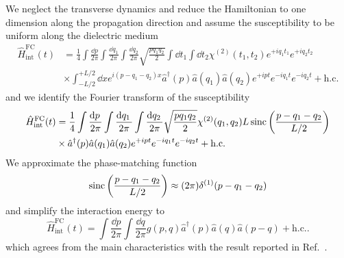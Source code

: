 We neglect the transverse dynamics and reduce the Hamiltonian to one dimension along the propagation direction and assume the susceptibility to be uniform along the dielectric medium
\begin{equation}
	\begin{split}
		\hat{H}_\text{int}^\text{FC}(t)
		&=
		\frac{1}{4}
		\int\frac{\dd{p}}{2\pi}
		\int\frac{\dd{q_1}}{2\pi}
		\int\frac{\dd{q_2}}{2\pi}
		\sqrt{\frac{pq_1q_2}{2}}
		\int\dd{t_1}
		\int\dd{t_2}
		\chi^{(2)}(t_1,t_2)
		e^{+iq_1t_1}
		e^{+iq_2t_2}
		\\
		&\times
		\int_{-L/2}^{+L/2}\dd{x}
		e^{i(p-q_1-q_2)x}
		\hat{a}^\dagger(p)
		\hat{a}(q_1)
		\hat{a}(q_2)
		e^{+ipt}
		e^{-iq_1t}
		e^{-iq_2t}
		+
		\text{h.c.}
	\end{split}
\end{equation}
and we identify the Fourier transform of the susceptibility
\begin{equation}
	\begin{split}
		\hat{H}_\text{int}^\text{FC}(t)
		&=
		\frac{1}{4}
		\int\frac{\dd{p}}{2\pi}
		\int\frac{\dd{q_1}}{2\pi}
		\int\frac{\dd{q_2}}{2\pi}
		\sqrt{\frac{pq_1q_2}{2}}
		\chi^{(2)}(q_1,q_2)L
		\sinc\left(\frac{p-q_1-q_2}{L/2}\right)
		\\
		&\times
		\hat{a}^\dagger(p)
		\hat{a}(q_1)
		\hat{a}(q_2)
		e^{+ipt}
		e^{-iq_1t}
		e^{-iq_2t}
		+
		\text{h.c.}
	\end{split}
\end{equation}
We approximate the phase-matching function
\begin{equation}
	\operatorname{sinc}\left(\frac{p-q_1-q_2}{L/2}\right)
	\approx
	(2\pi)
	\delta^{(1)}(p-q_1-q_2)
\end{equation}
and simplify the interaction energy to
\begin{equation}
	\hat{H}_\text{int}^\text{FC}(t)
	=
	\int\frac{\dd{p}}{2\pi}
	\int\frac{\dd{q}}{2\pi}
	g(p,q)
	\hat{a}^\dagger(p)
	\hat{a}(q)
	\hat{a}(p-q)
	+
	\text{h.c.}
	.
\end{equation}
which agrees from the main characteristics with the result reported in Ref.~\cite[eq.~35]{Horoshko2018}.